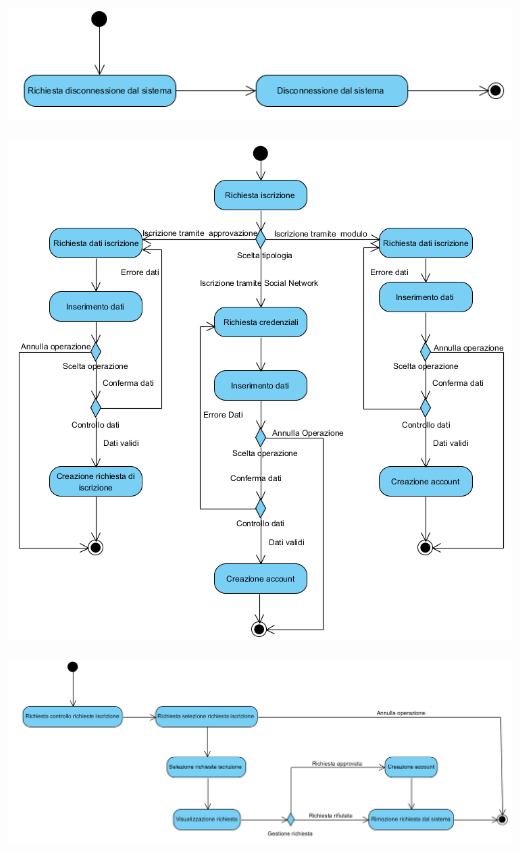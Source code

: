 \begin{center}
	\includegraphics[width=\textwidth]{assets/visualParadigm/attivita/logout}
\end{center}

\begin{center}
	\includegraphics[width=\textwidth]{assets/visualParadigm/attivita/iscrizioni}
\end{center}

\begin{center}
	\includegraphics[width=\textwidth]{assets/visualParadigm/attivita/approvazioneIscrizione}
\end{center}

